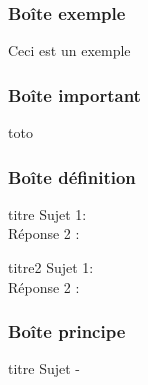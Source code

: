 \documentclass[b,e,cours]{D:/hubiC/GitHub/test_Baggio/paquets/classe_kara}
\begin{document}
\subsubsection{Boîte exemple}
\begin{frame}
\begin{exemple}{\null}
Ceci est un exemple
\end{exemple}

\end{frame}

\subsubsection{Boîte important}
\begin{frame}
\begin{important}{\null}
toto
\end{important}
\end{frame}

\subsubsection{Boîte définition}
\begin{frame}
\begin{madefinition}{titre}
Sujet 1:\\
Réponse 2 : 
\end{madefinition}
\end{frame}

\begin{frame}
\begin{madefinition}{titre2}
Sujet 1:\\
Réponse 2 : 
\end{madefinition}
\end{frame}
\subsubsection{Boîte principe}
\begin{frame}
\begin{monprincipe}{titre}
Sujet - \\
\end{monprincipe}
\end{frame}
\end{document}
